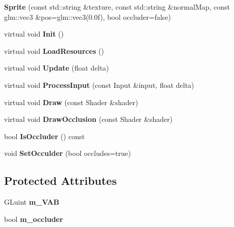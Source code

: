 \begin{DoxyCompactItemize}
\item 
\hypertarget{class_sprite_a790dbcc5010a40e4f96301fae1463a13}{}{\bfseries Sprite} (const std\+::string \&texture, const std\+::string \&normal\+Map, const glm\+::vec3 \&pos=glm\+::vec3(0.\+0f), bool occluder=false)\label{class_sprite_a790dbcc5010a40e4f96301fae1463a13}

\item 
\hypertarget{class_sprite_a66649cae82d7408511da0cc134929cc6}{}virtual void {\bfseries Init} ()\label{class_sprite_a66649cae82d7408511da0cc134929cc6}

\item 
\hypertarget{class_sprite_ad8e680c919372babeb8ac2a7b0f3c8c5}{}virtual void {\bfseries Load\+Resources} ()\label{class_sprite_ad8e680c919372babeb8ac2a7b0f3c8c5}

\item 
\hypertarget{class_sprite_a1ec8863103432518d18e02a95aeb4b1c}{}virtual void {\bfseries Update} (float delta)\label{class_sprite_a1ec8863103432518d18e02a95aeb4b1c}

\item 
\hypertarget{class_sprite_a5da029d021d1406c52a9ed0a0f786504}{}virtual void {\bfseries Process\+Input} (const Input \&input, float delta)\label{class_sprite_a5da029d021d1406c52a9ed0a0f786504}

\item 
\hypertarget{class_sprite_a875d883a65a4f3f8763317b76a57844f}{}virtual void {\bfseries Draw} (const Shader \&shader)\label{class_sprite_a875d883a65a4f3f8763317b76a57844f}

\item 
\hypertarget{class_sprite_ab05127b75bafa50187542f25d6acab61}{}virtual void {\bfseries Draw\+Occlusion} (const Shader \&shader)\label{class_sprite_ab05127b75bafa50187542f25d6acab61}

\item 
\hypertarget{class_sprite_ac9f507a9be2d94747e0a12795d995fe6}{}bool {\bfseries Is\+Occluder} () const \label{class_sprite_ac9f507a9be2d94747e0a12795d995fe6}

\item 
\hypertarget{class_sprite_ad40733e6b1c6566e8815c3ec3e6a7c48}{}void {\bfseries Set\+Occulder} (bool occludes=true)\label{class_sprite_ad40733e6b1c6566e8815c3ec3e6a7c48}

\end{DoxyCompactItemize}
\subsection*{Protected Attributes}
\begin{DoxyCompactItemize}
\item 
\hypertarget{class_sprite_a54fb0c4e6e34e5fbbe4ce36a396e6df9}{}G\+Luint {\bfseries m\+\_\+\+V\+A\+B}\label{class_sprite_a54fb0c4e6e34e5fbbe4ce36a396e6df9}

\item 
\hypertarget{class_sprite_a9591ef89614208af3da374e06cc83f57}{}bool {\bfseries m\+\_\+occluder}\label{class_sprite_a9591ef89614208af3da374e06cc83f57}

\end{DoxyCompactItemize}
